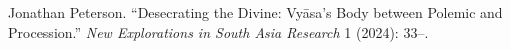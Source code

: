 Jonathan Peterson. “Desecrating the Divine: Vyāsa’s Body between Polemic and Procession.” \emph{New Explorations in South Asia Research} 1 (2024): 33–.
